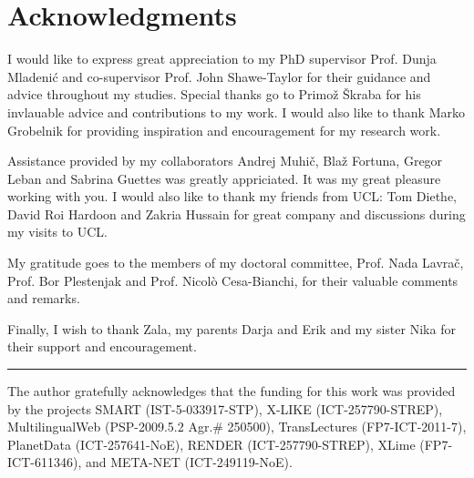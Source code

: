 %
\chapter*{Acknowledgments}

I would like to express great appreciation to my PhD supervisor Prof. Dunja
Mladenić and co-supervisor Prof. John Shawe-Taylor for their guidance and advice
throughout my studies. Special thanks go to Primož Škraba for his invlauable advice and contributions to my work.
I would also like to thank Marko Grobelnik for providing inspiration and encouragement for my research work.

Assistance provided by my collaborators Andrej Muhič, Blaž Fortuna, Gregor Leban
and Sabrina Guettes was greatly appriciated. It was my great pleasure working with you.
I would also like to thank my friends from UCL: Tom Diethe, David Roi Hardoon and Zakria Hussain
for great company and discussions during my visits to UCL.

My gratitude goes to the members of my doctoral committee, Prof. Nada Lavrač, Prof.
Bor Plestenjak and Prof. Nicolò Cesa-Bianchi, for their valuable comments and
remarks.

Finally, I wish to thank Zala, my parents Darja and Erik and my sister Nika
for their support and encouragement.

\rule{0.5\textwidth}{.4pt}

The author gratefully acknowledges that the funding for this work was provided by the projects
SMART (IST-5-033917-STP), X-LIKE (ICT-257790-STREP), MultilingualWeb (PSP-2009.5.2 Agr.\# 250500),
TransLectures (FP7-ICT-2011-7), PlanetData (ICT-257641-NoE), RENDER (ICT-257790-STREP), XLime (FP7-ICT-611346),
and META-NET (ICT-249119-NoE). 